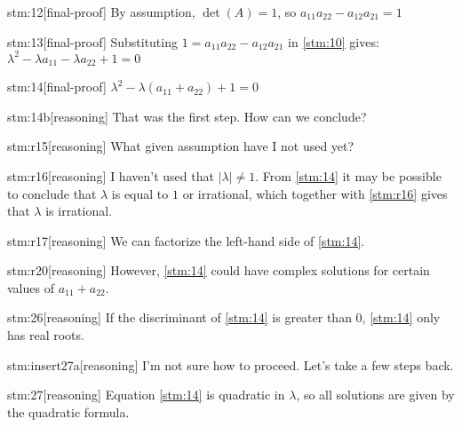 \documentclass{article}
\begin{document}
\begin{stm}{stm:12}[final-proof]
By assumption, $\det(A) = 1$, so $a_{11}a_{22} - a_{12}a_{21} = 1$
\end{stm}

\begin{stm}{stm:13}[final-proof]
Substituting $1 = a_{11}a_{22} - a_{12}a_{21}$ in \ref{stm:10} gives: $\lambda^2 - \lambda a_{11} - \lambda a_{22} + 1 = 0$
\end{stm}

\begin{stm}{stm:14}[final-proof]
$\lambda^2 - \lambda(a_{11} + a_{22}) + 1 = 0$
\end{stm}

\begin{stm}{stm:14b}[reasoning]
That was the first step. How can we conclude?
\end{stm}

\begin{stm}{stm:r15}[reasoning]
What given assumption have I not used yet?
\end{stm}

\begin{stm}{stm:r16}[reasoning]
I haven't used that $|\lambda| \ne 1$. From \ref{stm:14} it may be possible to conclude that $\lambda$ is equal to $1$ or irrational, which together with \ref{stm:r16} gives that $\lambda$ is irrational.
\end{stm}

\begin{stm}{stm:r17}[reasoning]
We can factorize the left-hand side of \ref{stm:14}.
\end{stm}

\begin{stm}{stm:r20}[reasoning]
However, \ref{stm:14} could have complex solutions for certain values of $a_{11} + a_{22}$.
\end{stm}

\begin{stm}{stm:26}[reasoning]
If the discriminant of \ref{stm:14} is greater than $0$, \ref{stm:14} only has real roots.
\end{stm}

\begin{stm}{stm:insert27a}[reasoning]
I'm not sure how to proceed. Let's take a few steps back.
\end{stm}

\begin{stm}{stm:27}[reasoning]
Equation \ref{stm:14} is quadratic in $\lambda$, so all solutions are given by the quadratic formula.
\end{stm}
\end{document}
